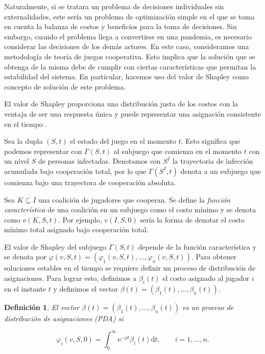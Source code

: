 \documentclass[11pt, oneside]{article}
\newtheorem{definition}{Definición}
\newcommand{\eu}{\ensuremath{\mathrm{e}}}
\newcommand{\du}{\ensuremath{\mathrm{d}}}
\begin{document}
 
Naturalmente, si se tratara un problema de decisiones individuales sin externalidades, este sería un problema de optimización simple en el que se toma en cuenta la balanza de costos y beneficios para la toma de decisiones. Sin embargo, cuando el problema llega a convertirse en una pandemia, es necesario considerar las decisiones de los demás actores. En este caso, consideramos una metodología de teoría de juegos cooperativa. Esto implica que la solución que se obtenga de la misma debe de cumplir con ciertas características que permitan la estabilidad del sistema. En particular, hacemos uso del valor de Shapley \cite{shapley} como concepto de solución de este problema.

El valor de Shapley proporciona una distribución justa de los costos con la ventaja de ser una respuesta única y puede representar una asignación consistente en el tiempo \cite{Petrosjan}.

Sea la dupla $(S,t)$ el estado del juego en el momento $t$. Esto significa que podemos representar con $\Gamma(S,t)$ al subjuego que comienza en el momento $t$ con un nivel $S$ de personas infectadas. Denotamos con $S^I$ la trayectoria de infección acumulada bajo cooperación total, por lo que $\Gamma(S^I,t)$ denota a un subjuego que comienza bajo una trayectora de cooperación absoluta.

Sea $K \subseteq I$ una coalición de jugadores que cooperan. Se define la \emph{función característica} de una coalición en un subjuego como el costo mínimo y se denota como $v(K,S,t)$. Por ejemplo, $v(I,S,0)$ sería la forma de denotar el costo mínimo total asignado bajo cooperación total.

El valor de Shapley del subjuego $\Gamma(S,t)$ depende de la función característica y se denota por $\varphi(v,S,t) = (\varphi_1(v,S,t),\dots,\varphi_n(v,S,t))$. Para obtener soluciones estables en el tiempo se requiere definir un proceso de distribución de asignaciones. Para lograr esto, definimos a $\beta_i(t)$ el costo asignado al jugador $i$ en el instante $t$ y definimos el vector $\beta(t) = (\beta_1(t),\dots, \beta_n(t))$.

\begin{definition}
El vector $\beta(t) = (\beta_1(t),\dots, \beta_n(t))$ es un \emph{proceso de distribución de asignaciones} (PDA) si 

\begin{equation}
	\varphi_i(v,S,0) = \int_0^\infty \eu^{-\rho t} \beta_i(t) \du t, \qquad  i = 1,\dots,n.
\end{equation}
\end{definition}
\end{document}
